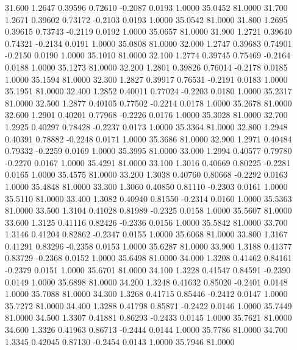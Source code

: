   31.600   1.2647   0.39596   0.72610  -0.2087   0.0193   1.0000  35.0452  81.0000
  31.700   1.2671   0.39602   0.73172  -0.2103   0.0193   1.0000  35.0542  81.0000
  31.800   1.2695   0.39615   0.73743  -0.2119   0.0192   1.0000  35.0657  81.0000
  31.900   1.2721   0.39640   0.74321  -0.2134   0.0191   1.0000  35.0808  81.0000
  32.000   1.2747   0.39683   0.74901  -0.2150   0.0190   1.0000  35.1010  81.0000
  32.100   1.2774   0.39745   0.75469  -0.2164   0.0188   1.0000  35.1273  81.0000
  32.200   1.2801   0.39826   0.76014  -0.2178   0.0185   1.0000  35.1594  81.0000
  32.300   1.2827   0.39917   0.76531  -0.2191   0.0183   1.0000  35.1951  81.0000
  32.400   1.2852   0.40011   0.77024  -0.2203   0.0180   1.0000  35.2317  81.0000
  32.500   1.2877   0.40105   0.77502  -0.2214   0.0178   1.0000  35.2678  81.0000
  32.600   1.2901   0.40201   0.77968  -0.2226   0.0176   1.0000  35.3028  81.0000
  32.700   1.2925   0.40297   0.78428  -0.2237   0.0173   1.0000  35.3364  81.0000
  32.800   1.2948   0.40391   0.78882  -0.2248   0.0171   1.0000  35.3686  81.0000
  32.900   1.2971   0.40484   0.79332  -0.2259   0.0169   1.0000  35.3995  81.0000
  33.000   1.2994   0.40577   0.79780  -0.2270   0.0167   1.0000  35.4291  81.0000
  33.100   1.3016   0.40669   0.80225  -0.2281   0.0165   1.0000  35.4575  81.0000
  33.200   1.3038   0.40760   0.80668  -0.2292   0.0163   1.0000  35.4848  81.0000
  33.300   1.3060   0.40850   0.81110  -0.2303   0.0161   1.0000  35.5110  81.0000
  33.400   1.3082   0.40940   0.81550  -0.2314   0.0160   1.0000  35.5363  81.0000
  33.500   1.3104   0.41028   0.81989  -0.2325   0.0158   1.0000  35.5607  81.0000
  33.600   1.3125   0.41116   0.82426  -0.2336   0.0156   1.0000  35.5842  81.0000
  33.700   1.3146   0.41204   0.82862  -0.2347   0.0155   1.0000  35.6068  81.0000
  33.800   1.3167   0.41291   0.83296  -0.2358   0.0153   1.0000  35.6287  81.0000
  33.900   1.3188   0.41377   0.83729  -0.2368   0.0152   1.0000  35.6498  81.0000
  34.000   1.3208   0.41462   0.84161  -0.2379   0.0151   1.0000  35.6701  81.0000
  34.100   1.3228   0.41547   0.84591  -0.2390   0.0149   1.0000  35.6898  81.0000
  34.200   1.3248   0.41632   0.85020  -0.2401   0.0148   1.0000  35.7088  81.0000
  34.300   1.3268   0.41715   0.85446  -0.2412   0.0147   1.0000  35.7272  81.0000
  34.400   1.3288   0.41798   0.85871  -0.2422   0.0146   1.0000  35.7449  81.0000
  34.500   1.3307   0.41881   0.86293  -0.2433   0.0145   1.0000  35.7621  81.0000
  34.600   1.3326   0.41963   0.86713  -0.2444   0.0144   1.0000  35.7786  81.0000
  34.700   1.3345   0.42045   0.87130  -0.2454   0.0143   1.0000  35.7946  81.0000
